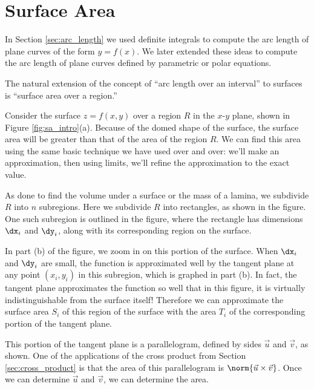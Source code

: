 \section{Surface Area}\label{sec:surface_area}

In Section \ref{sec:arc_length} we used definite integrals to compute the arc length of plane curves of the form $y=f(x)$. We later extended these ideas to compute the arc length of plane curves defined by parametric or polar equations. 

The natural extension of the concept of ``arc length over an interval'' to surfaces is ``surface area over a region.'' 

Consider the surface $z=f(x,y)$ over a region $R$ in the $x$-$y$ plane, shown in Figure \ref{fig:sa_intro}(a). Because of the domed shape of the surface, the surface area will be greater than that of the area of the region $R$. We can find this area using the same basic technique we have used over and over: we'll make an approximation, then using limits, we'll refine the approximation to the exact value.

As done to find the volume under a surface or the mass of a lamina, we subdivide $R$ into $n$ subregions. Here we subdivide $R$ into rectangles, as shown in the figure. One such subregion is outlined in the figure, where the rectangle has dimensions $\dx_i$ and $\dy_i$, along with its corresponding region on the surface.

In part (b) of the figure, we zoom in on this portion of the surface. When $\dx_i$ and $\dy_i$ are small, the function is approximated well by the tangent plane at any point $(x_i,y_i)$ in this subregion, which is graphed in part (b). In fact, the tangent plane approximates the function so well that in this figure, it is virtually indistinguishable from the surface itself! Therefore we can approximate the surface area $S_i$ of this region of the surface with the area $T_i$ of the corresponding portion of the tangent plane.

This portion of the tangent plane is a parallelogram, defined by sides $\vec u$ and $\vec v$, as shown. One of the applications of the cross product from Section \ref{sec:cross_product} is that the area of this parallelogram is $\norm{\vec u\times \vec v}$. Once we can determine $\vec u$ and $\vec v$, we can determine the area.

